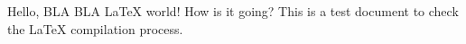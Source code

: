 \documentclass{article}
\begin{document}
Hello, BLA BLA LaTeX world! How is it going?
This is a test document to check the LaTeX compilation process.
\end{document}
